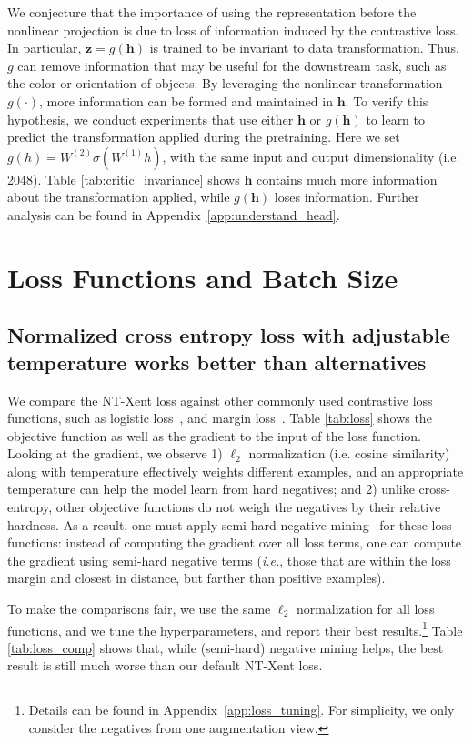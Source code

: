 We conjecture that the importance of using the representation before the nonlinear projection is due to loss of information induced by the contrastive loss. In particular, $\bm z=g(\bm h)$ is trained to be invariant to data transformation. Thus, $g$ can remove information that may be useful for the downstream task, such as the color or orientation of objects. By leveraging the nonlinear transformation $g(\cdot)$, more information can be formed and maintained in $\bm h$. To verify this hypothesis, we conduct experiments that use either $\bm h$ or $g(\bm h)$ to learn to predict the transformation applied during the pretraining. Here we set $g(h)=W^{(2)}\sigma(W^{(1)}h)$, with the same input and output dimensionality (i.e. 2048). Table \ref{tab:critic_invariance} shows $\bm h$ contains much more information about the transformation applied, while $g(\bm h)$ loses information. Further analysis can be found in Appendix~\ref{app:understand_head}.

\section{Loss Functions and Batch Size}

\subsection{Normalized cross entropy loss with adjustable temperature works better than alternatives}

We compare the NT-Xent loss against other commonly used contrastive loss functions, such as logistic loss~\cite{mikolov2013efficient}, and margin loss~\cite{schroff2015facenet}. Table \ref{tab:loss} shows the objective function as well as the gradient to the input of the loss function. Looking at the gradient, we observe 1) $\ell_2$ normalization (i.e. cosine similarity) along with temperature effectively weights different examples, and an appropriate temperature can help the model learn from hard negatives; and 2) unlike cross-entropy, other objective functions do not weigh the negatives by their relative hardness. As a result, one must apply semi-hard negative mining~\cite{schroff2015facenet} for these loss functions: instead of computing the gradient over all loss terms, one can compute the gradient using semi-hard negative terms (\textit{i.e.}, those that are within the loss margin and closest in distance, but farther than positive examples).

To make the comparisons fair, we use the same $\ell_2$ normalization for all loss functions, and we tune the hyperparameters, and report their best results.\footnote{Details can be found in Appendix~\ref{app:loss_tuning}. For simplicity, we only consider the negatives from one augmentation view. } Table \ref{tab:loss_comp} shows that, while (semi-hard) negative mining helps, the best result is still much worse than our default NT-Xent loss.

